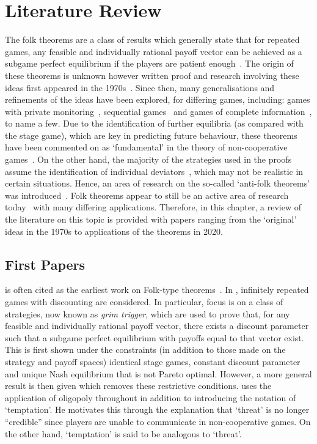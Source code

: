 \chapter{Literature Review}

The folk theorems are a class of results which generally state that for repeated
games, any feasible and individually rational payoff vector can be achieved as a
subgame perfect equilibrium if the players are patient enough~\cite{Li2019}. The
origin of these theorems is unknown however written proof and
research involving these ideas first appeared in the
1970s~\cite{Friedman1971, aumann1976long, Rubinstein1979}. Since then, many
generalisations and refinements of
the ideas have been explored, for differing games, including:
games with private monitoring~\cite{Matsushima2004, Hoerner2006, Peski2012}, sequential
games~\cite{Gossner1996, Bhaskar1998, Wen2002} and games of complete
information~\cite{Benoit_1985, Abreu1994, Bernergard2019}, to
name a few. Due to the identification of further equilibria (as compared with
the stage game), which are key in predicting future behaviour, these theorems
have been commented on as `fundamental' in the theory of non-cooperative
games~\cite{Hoerner2006, Li2015}. On the other hand, the majority of the strategies used in the
proofs assume the identification of individual deviators~\cite{Masso1989}, which may not
be realistic in certain situations. Hence, an area of research on the so-called
`anti-folk theorems' was introduced~\cite{Masso1989, Yoon2001, Peski2012}. Folk theorems appear to still be an
active area of research today~\cite{Ikeda2020, Parras2020, Wang2020} with many differing applications.
Therefore, in this chapter, a review of the literature on this topic is provided
with papers ranging from the `original' ideas in the 1970s to applications of
the theorems in 2020. 


\section{First Papers}\label{sec:First_Papers}
\cite{Friedman1971} is often cited as the earliest work on Folk-type
theorems~\cite{Abreu1994, }. In \cite{Friedman1971}, infinitely repeated games with
discounting are considered. In particular, focus is on a class of strategies,
now known as \emph{grim trigger}, which are used to prove that, for any feasible
and individually rational payoff vector, there exists a discount parameter such
that a subgame perfect equilibrium with payoffs equal to that vector exist. This
is first shown under the constraints (in addition to those made on the strategy
and payoff spaces) identical stage games, constant discount parameter and unique
Nash equilibrium that is not Pareto optimal. However, a more general result is
then given which removes these restrictive conditions. \cite{Friedman1971} uses
the application of oligopoly throughout in addition to introducing the notation
of `temptation'. He motivates this through the explanation that `threat' is no
longer ``credible'' since players are unable to communicate in non-cooperative
games. On the other hand, `temptation' is said to be analogous to `threat'.


